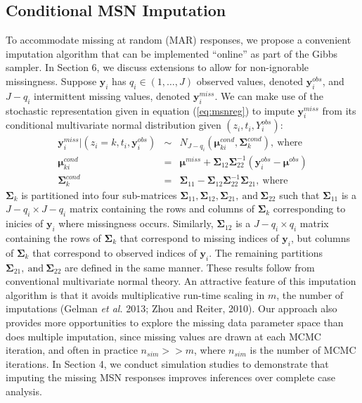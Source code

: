 \documentclass[useAMS,referee]{biom}
\begin{document}
\subsection{Conditional MSN Imputation}
To accommodate missing at random (MAR) responses, we propose a convenient imputation algorithm that can be implemented ``online'' as part of the Gibbs sampler. In Section 6, we discuss extensions to allow for non-ignorable missingness. Suppose $\mathbf{y}_i$ has $q_i\in (1,\ldots,J)$ observed values, denoted $\mathbf{y}^{obs}_i$, and $J-q_i$ intermittent missing values, denoted $\mathbf{y}^{miss}_i$. We can make use of the stochastic representation given in equation (\ref{eq:msnreg}) to impute $\mathbf{y}^{miss}_i$ from its conditional multivariate normal distribution given $(z_i,t_i,Y^{obs}_i)$:
\begin{eqnarray}
\mathbf{y}^{miss}_i|(z_i=k,t_i,\mathbf{y}^{obs}_i)&\sim& N_{J-q_i}(\boldsymbol\mu^{cond}_{ki},\boldsymbol\Sigma^{cond}_k),~\text{where}\nonumber\\
\boldsymbol\mu^{cond}_{ki}&=& \boldsymbol\mu^{miss} + \boldsymbol\Sigma_{12} \boldsymbol\Sigma_{22}^{-1}(\mathbf{y}^{obs}_i - \boldsymbol\mu^{obs})\\
\boldsymbol\Sigma^{cond}_k&=& \boldsymbol\Sigma_{11} - \boldsymbol\Sigma_{12}\boldsymbol\Sigma_{22}^{-1}\boldsymbol\Sigma_{21},~\text{where}\nonumber
\end{eqnarray}
$\boldsymbol\Sigma_k$ is partitioned into four sub-matrices $\boldsymbol\Sigma_{11},\boldsymbol\Sigma_{12},\boldsymbol\Sigma_{21}, \ \text{and} \ \boldsymbol\Sigma_{22}$ such that $\boldsymbol\Sigma_{11}$ is a $J-q_i \times J-q_i$ matrix containing the rows and columns of $\boldsymbol\Sigma_k$ corresponding to inicies of $\mathbf{y}_{i}$ where missingness occurs. Similarly, $\boldsymbol\Sigma_{12}$ is a $J-q_i \times q_i$ matrix containing the rows of $\boldsymbol\Sigma_k$ that correspond to missing indices of $\mathbf{y}_i$, but columns of $\boldsymbol\Sigma_k$ that correspond to observed indices of $\mathbf{y}_i$. The remaining partitions $\boldsymbol\Sigma_{21}, \ \text{and} \ \boldsymbol\Sigma_{22}$ are defined in the same manner. These results follow from conventional multivariate normal theory. An attractive feature of this imputation algorithm is that it avoids multiplicative run-time scaling in $m$, the number of imputations (Gelman \textit{et al.} 2013; Zhou and Reiter, 2010). Our approach also provides more opportunities to explore the missing data parameter space than does multiple imputation, since missing values are drawn at each MCMC iteration, and often in practice $n_{sim} >> m$, where $n_{sim}$ is the number of MCMC iterations. In Section 4, we conduct simulation studies to demonstrate that imputing the missing MSN responses improves inferences over complete case analysis.
\end{document}
